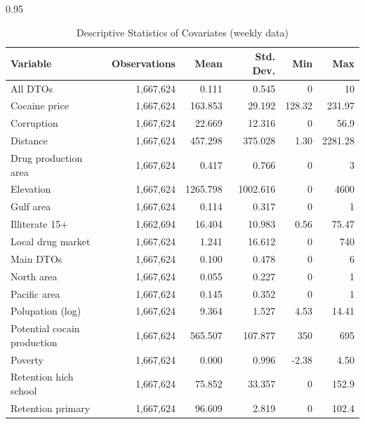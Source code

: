 \documentclass[12pt,letterpaper]{article}
\begin{document}
\begin{table}[h!]
\small
    \caption{Descriptive Statistics of Covariates (weekly data)}
    \label{tab:descriptive_covariates}
\begin{spacing}{0.95}
    \centering
    \begin{tabular}{lrrrrr}
    \hline
		Variable       	&	 Observations 	&	Mean	&	Std. Dev.	&	Min	&	Max	 \\	\hline
														
		All DTOs	&	 1,667,624 	&	0.111	&	0.545	&	0	&	10	 \\	
		Cocaine price	&	 1,667,624 	&	163.853	&	29.192	&	128.32	&	231.97	 \\	
		Corruption	&	 1,667,624 	&	22.669	&	12.316	&	0	&	56.9	 \\	
		Distance	&	 1,667,624 	&	457.298	&	375.028	&	1.30	&	2281.28	 \\	
		Drug production area	&	 1,667,624 	&	0.417	&	0.766	&	0	&	3	 \\	
		Elevation	&	 1,667,624 	&	1265.798	&	1002.616	&	0	&	4600	 \\	
		Gulf area	&	 1,667,624 	&	0.114	&	0.317	&	0	&	1	 \\	
		Illiterate 15+	&	 1,662,694 	&	16.404	&	10.983	&	0.56	&	75.47	 \\	
		Local drug market	&	 1,667,624 	&	1.241	&	16.612	&	0	&	740	 \\	
		Main DTOs	&	 1,667,624 	&	0.100	&	0.478	&	0	&	6	 \\	
		North area	&	 1,667,624 	&	0.055	&	0.227	&	0	&	1	 \\	
		Pacific area	&	 1,667,624 	&	0.145	&	0.352	&	0	&	1	 \\	
		Polupation (log)	&	 1,667,624 	&	9.364	&	1.527	&	4.53	&	14.41	 \\	
		Potential cocain production	&	 1,667,624 	&	565.507	&	107.877	&	350	&	695	 \\	
		Poverty	&	 1,667,624 	&	0.000	&	0.996	&	-2.38	&	4.50	 \\	
		Retention hich school	&	 1,667,624 	&	75.852	&	33.357	&	0	&	152.9	 \\	
		Retention primary	&	 1,667,624 	&	96.609	&	2.819	&	0	&	102.4	 \\	

\end{tabular}
\end{spacing}
\end{table}
\end{document}
